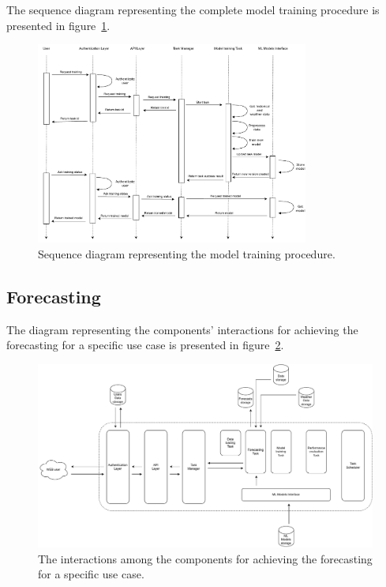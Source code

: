 The sequence diagram representing the complete model training procedure is presented in figure~\ref{fig:trainingsequence}.

\begin{figure}[H]
\centering
\includegraphics[width=0.8\textwidth]{images/architecture_training_sequence}
\caption{Sequence diagram representing the model training procedure.}
\label{fig:trainingsequence}
\end{figure}


\vspace{0.1 cm}
\subsection{Forecasting}
\label{sec:forecasting}
\vspace{0.1 cm}

The diagram representing the components' interactions for achieving the forecasting for a specific use case is presented in figure~\ref{fig:forecastinginteractions}.

\begin{figure}[H]
\centering
\includegraphics[width=1\textwidth]{images/architecture_forecasting_interactions}
\caption{The interactions among the components for achieving the forecasting for a specific use case.}
\label{fig:forecastinginteractions}
\end{figure}

